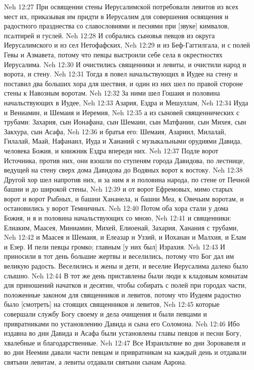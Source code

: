 Neh 12:27  При освящении стены Иерусалимской потребовали левитов из всех мест их, приказывая им придти в Иерусалим для совершения освящения и радостного празднества со славословиями и песнями при [звуке] кимвалов, псалтирей и гуслей.
Neh 12:28  И собрались сыновья певцов из округа Иерусалимского и из сел Нетофафских,
Neh 12:29  и из Беф-Гаггилгала, и с полей Гевы и Азмавета, потому что певцы выстроили себе села в окрестностях Иерусалима.
Neh 12:30  И очистились священники и левиты, и очистили народ и ворота, и стену.
Neh 12:31  Тогда я повел начальствующих в Иудее на стену и поставил два больших хора для шествия, и один из них шел по правой стороне стены к Навозным воротам.
Neh 12:32  За ними шел Гошаия и половина начальствующих в Иудее,
Neh 12:33  Азария, Ездра и Мешуллам,
Neh 12:34  Иуда и Вениамин, и Шемаия и Иеремия,
Neh 12:35  а из сыновей священнических с трубами: Захария, сын Ионафана, сын Шемаии, сын Матфании, сын Михея, сын Закхура, сын Асафа,
Neh 12:36  и братья его: Шемаия, Азариил, Милалай, Гилалай, Маай, Нафанаил, Иуда и Хананий с музыкальными орудиями Давида, человека Божия, и книжник Ездра впереди них.
Neh 12:37  Подле ворот Источника, против них, они взошли по ступеням города Давидова, по лестнице, ведущей на стену сверх дома Давидова до Водяных ворот к востоку.
Neh 12:38  Другой хор шел напротив них, и за ним я и половина народа, по стене от Печной башни и до широкой стены,
Neh 12:39  и от ворот Ефремовых, мимо старых ворот и ворот Рыбных, и башни Хананела, и башни Меа, к Овечьим воротам, и остановились у ворот Темничных.
Neh 12:40  Потом оба хора стали у дома Божия, и я и половина начальствующих со мною,
Neh 12:41  и священники: Елиаким, Маасея, Миниамин, Михей, Елиоенай, Захария, Ханания с трубами,
Neh 12:42  и Маасея и Шемаия, и Елеазар и Уззий, и Иоханан и Малхия, и Елам и Езер. И пели певцы громко; главным [у них был] Израхия.
Neh 12:43  И приносили в тот день большие жертвы и веселились, потому что Бог дал им великую радость. Веселились и жены и дети, и веселие Иерусалима далеко было слышно.
Neh 12:44  В тот же день приставлены были люди к кладовым комнатам для приношений начатков и десятин, чтобы собирать с полей при городах части, положенные законом для священников и левитов, потому что Иудеям радостно было [смотреть] на стоящих священников и левитов,
Neh 12:45  которые совершали службу Богу своему и дела очищения и были певцами и привратниками по установлению Давида и сына его Соломона.
Neh 12:46  Ибо издавна во дни Давида и Асафа были установлены главы певцов и песни Богу, хвалебные и благодарственные.
Neh 12:47  Все Израильтяне во дни Зоровавеля и во дни Неемии давали части певцам и привратникам на каждый день и отдавали святыни левитам, а левиты отдавали святыни сынам Аарона.
